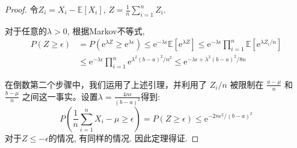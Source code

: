 \begin{proof}
    令$Z_i=X_i-\mathbb{E}\left[X_i\right]$, $Z=\frac 1 n \sum_{i=1}^n Z_i.$

    对于任意的$\lambda>0$, 根据Markov不等式, 
    $$
    \begin{aligned}
    P(Z \geq \epsilon) & =P\left(\mathrm{e}^{\lambda Z} \geq \mathrm{e}^{\lambda \epsilon}\right) \leq \mathrm{e}^{-\lambda \epsilon} \mathbb{E}\left[\mathrm{e}^{\lambda Z}\right] \leq \mathrm{e}^{-\lambda \epsilon} \prod_{i=1}^n \mathbb{E}\left[\mathrm{e}^{\lambda Z_i / n}\right] \\
    & \leq \mathrm{e}^{-\lambda \epsilon} \prod_{i=1}^n \mathrm{e}^{\lambda^2(b-a)^2 / n^2} \leq \mathrm{e}^{-\lambda \epsilon+\lambda^2(b-a)^2 / 8 n}
    \end{aligned}
    $$

    在倒数第二个步骤中，我们运用了上述引理，并利用了 $Z_i/n$ 被限制在 $\frac{a - \mu}{n}$ 和 $\frac{b - \mu}{n}$ 之间这一事实。设置$\lambda=\frac{4 n \epsilon}{(b-a)^2}$得到: 
    $$
P\left(\frac{1}{n} \sum_{i=1}^n X_i-\mu \geq \epsilon\right)=P(Z \geq \epsilon) \leq \mathrm{e}^{-2 n \epsilon^2 /(b-a)^2}
$$
对于$Z\leq -\epsilon$的情况, 有同样的情况. 因此定理得证. 

\end{proof}